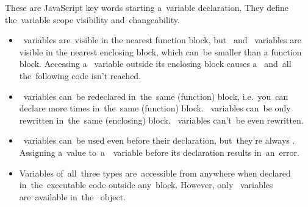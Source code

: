 These are JavaScript key words starting a~variable declaration.
They define the~variable scope visibility and~changeability.

\begin{itemize}
    \item {}~variables are~visible in the nearest function block, but~ and~ variables are visible in the nearest enclosing block, which can~be smaller than a function block.
          Accessing a~ variable outside its enclosing block causes a~ and~all the~following code isn't reached.
    \item {}~variables can~be redeclared in~the~same (function) block, i.e.~you~can declare  more times in~the~same (function) block.
          ~variables can~be only rewritten in~the~same (enclosing) block.
          ~variables can't~be even rewritten.
    \item {}~variables can~be used even before their declaration, but~they're always .
          Assigning a~value to~a~~variable before its declaration results in~an~error.
    \item Variables of~all~three types are~accessible from anywhere when declared in~the~executable code outside any~block.
          However, only ~variables are~available in~the~ object.
\end{itemize}

